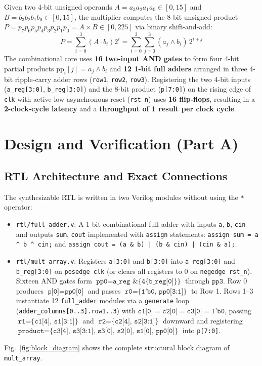 \documentclass[conference,10pt]{IEEEtran}
\begin{document}
Given two 4-bit unsigned operands $A = a_3a_2a_1a_0 \in [0, 15]$ and $B = b_3b_2b_1b_0 \in [0, 15]$, the multiplier computes the 8-bit unsigned product $P = p_7p_6p_5p_4p_3p_2p_1p_0 = A \times B \in [0, 225]$ via binary shift-and-add:
\begin{equation}
    P = \sum_{i=0}^{3} \left( A \cdot b_i \right) 2^i = \sum_{i=0}^{3} \sum_{j=0}^{3} (a_j \wedge b_i)\,2^{i+j}
\end{equation}
The combinational core uses \textbf{16 two-input AND gates} to form four 4-bit partial products $\text{pp}_i[j] = a_j \wedge b_i$ and \textbf{12 1-bit full adders} arranged in three 4-bit ripple-carry adder rows (\texttt{row1}, \texttt{row2}, \texttt{row3}). Registering the two 4-bit inputs (\texttt{a\_reg[3:0]}, \texttt{b\_reg[3:0]}) and the 8-bit product (\texttt{p[7:0]}) on the rising edge of \texttt{clk} with active-low asynchronous reset (\texttt{rst\_n}) uses \textbf{16 flip-flops}, resulting in a \textbf{2-clock-cycle latency} and a \textbf{throughput of 1 result per clock cycle}.

\section{Design and Verification (Part A)}

\subsection{RTL Architecture and Exact Connections}
The synthesizable RTL is written in two Verilog modules without using the \texttt{*} operator:
\begin{itemize}
    \item \texttt{rtl/full\_adder.v}: A 1-bit combinational full adder with inputs \texttt{a}, \texttt{b}, \texttt{cin} and outputs \texttt{sum}, \texttt{cout} implemented with \texttt{assign} statements:
    \texttt{assign sum = a \^{} b \^{} cin;} and \texttt{assign cout = (a \& b) | (b \& cin) | (cin \& a);}.
    \item \texttt{rtl/mult\_array.v}: Registers \texttt{a[3:0]} and \texttt{b[3:0]} into \texttt{a\_reg[3:0]} and \texttt{b\_reg[3:0]} on \texttt{posedge clk} (or clears all registers to $0$ on \texttt{negedge rst\_n}). Sixteen AND gates form $\texttt{pp0} = \texttt{a\_reg \& \{4\{b\_reg[0]\}\}}$ through $\texttt{pp3}$. Row 0 produces $\texttt{p[0]} = \texttt{pp0[0]}$ and passes $\texttt{r0} = \texttt{\{1'b0, pp0[3:1]\}}$ to Row 1. Rows 1--3 instantiate 12 \texttt{full\_adder} modules via a \texttt{generate} loop (\texttt{adder\_columns[0..3].row1..3}) with $\texttt{c1[0]} = \texttt{c2[0]} = \texttt{c3[0]} = \texttt{1'b0}$, passing $\texttt{r1} = \texttt{\{c1[4], s1[3:1]\}}$ and $\texttt{r2} = \texttt{\{c2[4], s2[3:1]\}}$ downward and registering $\texttt{product} = \texttt{\{c3[4], s3[3:1], s3[0], s2[0], s1[0], pp0[0]\}}$ into \texttt{p[7:0]}.
\end{itemize}
Fig.~\ref{fig:block_diagram} shows the complete structural block diagram of \texttt{mult\_array}.
\end{document}
